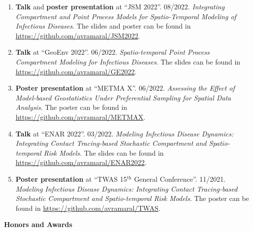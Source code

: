 \documentclass[11pt, ]{article}
\begin{document}
	\begin{enumerate}
		\item \textbf{Talk} and \textbf{poster presentation} at ``JSM 2022''. 08/2022. \textit{Integrating Compartment and Point Process Models for Spatio-Temporal Modeling of Infectious Diseases}. The slides and poster can be found in \href{https://github.com/avramaral/JSM2022}{https://github.com/avramaral/JSM2022}.
		
		\item \textbf{Talk} at ``GeoEnv 2022''. 06/2022. \textit{Spatio-temporal Point Process Compartment Modeling for Infectious Diseases}. The slides can be found in \href{https://github.com/avramaral/GE2022}{https://github.com/avramaral/GE2022}.
		
		\item \textbf{Poster presentation} at ``METMA X''. 06/2022. \textit{Assessing the Effect of Model-based Geostatistics Under Preferential Sampling for Spatial Data Analysis}. The poster can be found in \href{https://github.com/avramaral/METMAX}{https://github.com/avramaral/METMAX}.
		
		\item \textbf{Talk} at ``ENAR 2022''. 03/2022. \textit{Modeling Infectious Disease Dynamics: Integrating Contact Tracing-based	Stochastic Compartment and Spatio-temporal Risk Models}. The slides can be found in \href{https://github.com/avramaral/ENAR2022}{https://github.com/avramaral/ENAR2022}.
		
		\item \textbf{Poster presentation} at ``TWAS 15${}^{\text{th}}$ General Conference''. 11/2021. \textit{Modeling Infectious Disease Dynamics: Integrating Contact Tracing-based	Stochastic Compartment and Spatio-temporal Risk Models}. The poster can be found in \href{https://github.com/avramaral/TWAS}{https://github.com/avramaral/TWAS}.
	\end{enumerate}

\vspace{6pt}

{\Large \textbf{Honors and Awards}}
\end{document}
